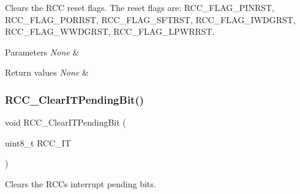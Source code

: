 Clears the R\+CC reset flags. The reset flags are\+: R\+C\+C\+\_\+\+F\+L\+A\+G\+\_\+\+P\+I\+N\+R\+ST, R\+C\+C\+\_\+\+F\+L\+A\+G\+\_\+\+P\+O\+R\+R\+ST, R\+C\+C\+\_\+\+F\+L\+A\+G\+\_\+\+S\+F\+T\+R\+ST, R\+C\+C\+\_\+\+F\+L\+A\+G\+\_\+\+I\+W\+D\+G\+R\+ST, R\+C\+C\+\_\+\+F\+L\+A\+G\+\_\+\+W\+W\+D\+G\+R\+ST, R\+C\+C\+\_\+\+F\+L\+A\+G\+\_\+\+L\+P\+W\+R\+R\+ST. 


\begin{DoxyParams}{Parameters}
{\em None} & \\
\hline
\end{DoxyParams}

\begin{DoxyRetVals}{Return values}
{\em None} & \\
\hline
\end{DoxyRetVals}
\mbox{\label{group___r_c_c_ga529842d165910f8f87e26115da36089b}} 
\subsubsection{\texorpdfstring{R\+C\+C\+\_\+\+Clear\+I\+T\+Pending\+Bit()}{RCC\_ClearITPendingBit()}}
{\footnotesize\ttfamily void R\+C\+C\+\_\+\+Clear\+I\+T\+Pending\+Bit (\begin{DoxyParamCaption}\item[{uint8\+\_\+t}]{R\+C\+C\+\_\+\+IT }\end{DoxyParamCaption})}



Clears the R\+CC\textquotesingle{}s interrupt pending bits. 


